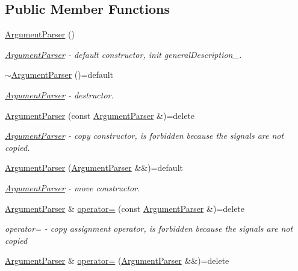 \subsection*{Public Member Functions}
\begin{DoxyCompactItemize}
\item 
\hyperlink{a00002_afd444aa0096628fee7fa3cd54dd8c00e_afd444aa0096628fee7fa3cd54dd8c00e}{Argument\+Parser} ()
\begin{DoxyCompactList}\small\item\em \hyperlink{a00002}{Argument\+Parser} -\/ default constructor, init general\+Description\+\_\+. \end{DoxyCompactList}\item 
\hyperlink{a00002_a299b7d944021ccd4bb8d3f1f6edd0718_a299b7d944021ccd4bb8d3f1f6edd0718}{$\sim$\+Argument\+Parser} ()=default
\begin{DoxyCompactList}\small\item\em \hyperlink{a00002}{Argument\+Parser} -\/ destructor. \end{DoxyCompactList}\item 
\hyperlink{a00002_a90ccb3b7ce3f2c34a0b78533a0f6c128_a90ccb3b7ce3f2c34a0b78533a0f6c128}{Argument\+Parser} (const \hyperlink{a00002}{Argument\+Parser} \&)=delete
\begin{DoxyCompactList}\small\item\em \hyperlink{a00002}{Argument\+Parser} -\/ copy constructor, is forbidden because the signals are not copied. \end{DoxyCompactList}\item 
\hyperlink{a00002_a84ce25cfd160d268d2c318a3c52c08fa_a84ce25cfd160d268d2c318a3c52c08fa}{Argument\+Parser} (\hyperlink{a00002}{Argument\+Parser} \&\&)=default
\begin{DoxyCompactList}\small\item\em \hyperlink{a00002}{Argument\+Parser} -\/ move constructor. \end{DoxyCompactList}\item 
\hyperlink{a00002}{Argument\+Parser} \& \hyperlink{a00002_a5c4f3f8135e422646c435d831044528d_a5c4f3f8135e422646c435d831044528d}{operator=} (const \hyperlink{a00002}{Argument\+Parser} \&)=delete
\begin{DoxyCompactList}\small\item\em operator= -\/ copy assignment operator, is forbidden because the signals are not copied \end{DoxyCompactList}\item 
\hyperlink{a00002}{Argument\+Parser} \& \hyperlink{a00002_a5158bbe2aac6767154d0e25a8cb66a6a_a5158bbe2aac6767154d0e25a8cb66a6a}{operator=} (\hyperlink{a00002}{Argument\+Parser} \&\&)=delete

\end{DoxyCompactItemize}
